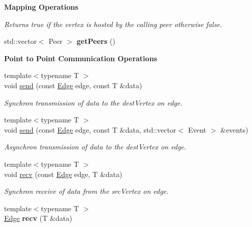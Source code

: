 \begin{Indent}{\bf Mapping Operations}
\begin{DoxyCompactItemize}
\begin{DoxyCompactList}\small\item\em Returns true if the {\itshape vertex} is hosted by the calling peer otherwise false. \end{DoxyCompactList}\item 
\hypertarget{structgraybat_1_1Cage_a2eef0dae96d63420aaee9bdc95f7f977}{}std\+::vector$<$ Peer $>$ {\bfseries get\+Peers} ()\label{structgraybat_1_1Cage_a2eef0dae96d63420aaee9bdc95f7f977}

\end{DoxyCompactItemize}
\end{Indent}
\begin{Indent}{\bf Point to Point Communication Operations}\par
\begin{DoxyCompactItemize}
\item 
{\footnotesize template$<$typename T $>$ }\\void \hyperlink{structgraybat_1_1Cage_ab9a114ae8076ccbe9b233c68ff2d155b}{send} (const \hyperlink{structgraybat_1_1CommunicationEdge}{Edge} edge, const T \&data)
\begin{DoxyCompactList}\small\item\em Synchron transmission of {\itshape data} to the {\itshape dest\+Vertex} on {\itshape edge}. \end{DoxyCompactList}\item 
{\footnotesize template$<$typename T $>$ }\\void \hyperlink{structgraybat_1_1Cage_abbd6352f368e4d3cafa3ba26f54c6e93}{send} (const \hyperlink{structgraybat_1_1CommunicationEdge}{Edge} edge, const T \&data, std\+::vector$<$ Event $>$ \&events)
\begin{DoxyCompactList}\small\item\em Asynchron transmission of {\itshape data} to the {\itshape dest\+Vertex} on {\itshape edge}. \end{DoxyCompactList}\item 
{\footnotesize template$<$typename T $>$ }\\void \hyperlink{structgraybat_1_1Cage_aa3085ae78588c6bc49aae16391abc52f}{recv} (const \hyperlink{structgraybat_1_1CommunicationEdge}{Edge} edge, T \&data)
\begin{DoxyCompactList}\small\item\em Synchron receive of {\itshape data} from the {\itshape src\+Vertex} on {\itshape edge}. \end{DoxyCompactList}\item 
\hypertarget{structgraybat_1_1Cage_a6714c94d1ae252456f7801e47cbee345}{}{\footnotesize template$<$typename T $>$ }\\\hyperlink{structgraybat_1_1CommunicationEdge}{Edge} {\bfseries recv} (T \&data)\label{structgraybat_1_1Cage_a6714c94d1ae252456f7801e47cbee345}


\end{DoxyCompactItemize}
\end{Indent}
